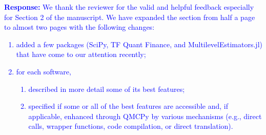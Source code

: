\documentclass{amsart}
\newcommand{\scnote}[1]{ {\textcolor{blue}  {\mbox{\bf Response:} #1}}}
\begin{document}
%
%

\vspace{10ex}

\scnote{ 
We thank the reviewer for the valid and helpful feedback especially for Section 2 of the manuscript. We have expanded the section from half a page to almost two pages with the following changes: 
\begin{enumerate}
 \item added a few packages (SciPy, TF Quant Finance, and MultilevelEstimators.jl) that have come to our attention recently; 
 \item for each software, 
    \begin{enumerate}
        \item described in more detail some of its best features;
        \item specified if some or all of the best features are accessible and, if applicable, enhanced through QMCPy by various mechanisms (e.g., direct calls, wrapper functions, code compilation, or direct translation).
    \end{enumerate}
\end{enumerate}
}
\end{document}
